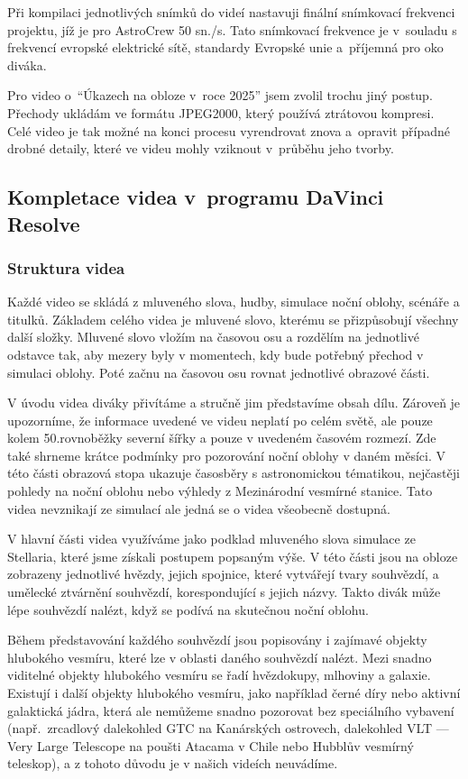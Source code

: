 \documentclass[12pt,a4paper,titlepage]{article}
\begin{document}
Při kompilaci jednotlivých snímků do videí nastavuji finální snímkovací frekvenci projektu, jíž je pro AstroCrew 50 sn./s. Tato snímkovací frekvence je v~souladu s frekvencí evropské elektrické sítě, standardy Evropské unie a~příjemná pro oko diváka.

Pro video o~\enquote{Úkazech na obloze v~roce 2025} jsem zvolil trochu jiný postup. Přechody ukládám ve formátu JPEG2000, který používá ztrátovou kompresi. Celé video je tak možné na konci procesu vyrendrovat znova a~opravit případné drobné detaily, které ve videu mohly vziknout v~průběhu jeho tvorby.
\subsection{Kompletace videa v~programu DaVinci Resolve}\label{makingof:resolve}
\subsubsection{Struktura videa}\label{makingof:resolve:structure}
Každé video se skládá z mluveného slova, hudby, simulace noční oblohy, scénáře a titulků. Základem celého videa je mluvené slovo, kterému se přizpůsobují všechny další složky. Mluvené slovo vložím na časovou osu a rozdělím na jednotlivé odstavce tak, aby mezery byly v momentech, kdy bude potřebný přechod v simulaci oblohy. Poté začnu na časovou osu rovnat jednotlivé obrazové části.

V úvodu videa diváky přivítáme a stručně jim představíme obsah dílu. Zároveň je upozorníme, že informace uvedené ve videu neplatí po celém světě, ale pouze kolem 50.\@ rovnoběžky severní šířky a pouze v uvedeném časovém rozmezí. Zde také shrneme krátce podmínky pro pozorování noční oblohy v daném měsíci. V této části obrazová stopa ukazuje časosběry s astronomickou tématikou, nejčastěji pohledy na noční oblohu nebo výhledy z Mezinárodní vesmírné stanice. Tato videa nevznikají ze simulací ale jedná se o videa všeobecně dostupná.

V hlavní části videa využíváme jako podklad mluveného slova simulace ze Stellaria, které jsme získali postupem popsaným výše. V této části jsou na obloze zobrazeny jednotlivé hvězdy, jejich spojnice, které vytvářejí tvary souhvězdí, a umělecké ztvárnění souhvězdí, korespondující s jejich názvy. Takto divák může lépe souhvězdí nalézt, když se podívá na skutečnou noční oblohu. 

Během představování každého souhvězdí jsou popisovány i zajímavé objekty hlubokého vesmíru, které lze v oblasti daného souhvězdí nalézt. Mezi snadno viditelné objekty hlubokého vesmíru se řadí hvězdokupy, mlhoviny a galaxie. Existují i další objekty hlubokého vesmíru, jako například černé díry nebo aktivní galaktická jádra, která ale nemůžeme snadno pozorovat bez speciálního vybavení (např.\ zrcadlový dalekohled GTC na Kanárských ostrovech, dalekohled VLT --- Very Large Telescope na poušti Atacama v Chile nebo Hubblův vesmírný teleskop), a z tohoto důvodu je v našich videích neuvádíme.
\end{document}
